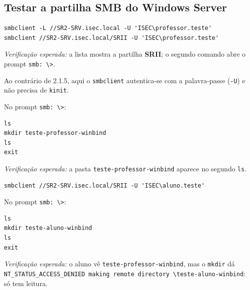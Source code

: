 
\subsection[Testar a partilha SMB do Windows Server]{Testar a partilha SMB do Windows Server}



\begin{lstlisting}[style=bashstyle]
smbclient -L //SR2-SRV.isec.local -U 'ISEC\professor.teste'
smbclient //SR2-SRV.isec.local/SRII -U 'ISEC\professor.teste'
\end{lstlisting}

\emph{Verificação esperada:} a lista mostra a partilha \textbf{SRII}; o segundo comando abre o prompt \texttt{smb: \textbackslash{}\textgreater{}}.

\begin{simplesbox}
Ao contrário de 2.1.5, aqui o \texttt{smbclient} autentica-se com a palavra-passe (\texttt{-U}) e não precisa de \texttt{kinit}.
\end{simplesbox}


No prompt \texttt{smb: \textbackslash{}\textgreater{}}:

\begin{lstlisting}[style=cfgstyle]
ls
mkdir teste-professor-winbind
ls
exit
\end{lstlisting}

\emph{Verificação esperada:} a pasta \texttt{teste-professor-winbind} aparece no segundo \texttt{ls}.


\begin{lstlisting}[style=bashstyle]
smbclient //SR2-SRV.isec.local/SRII -U 'ISEC\aluno.teste'
\end{lstlisting}

No prompt \texttt{smb: \textbackslash{}\textgreater{}}:

\begin{lstlisting}[style=cfgstyle]
ls
mkdir teste-aluno-winbind
ls
exit
\end{lstlisting}

\emph{Verificação esperada:} o aluno vê \texttt{teste-professor-winbind}, mas o \texttt{mkdir} dá \texttt{NT\_STATUS\_ACCESS\_DENIED making remote directory \textbackslash{}teste-aluno-winbind}: só tem leitura.

